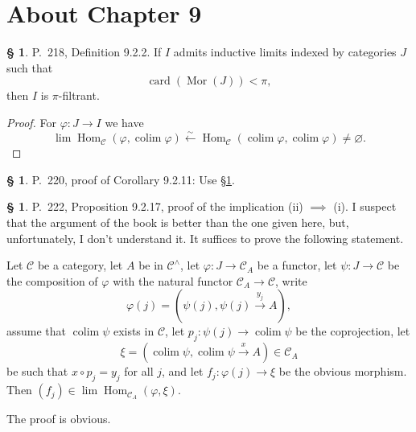 \documentclass[12pt]{article}
\theoremstyle{remark}
\theoremstyle{definition}
\newtheorem{s}[thm]{\S}
\newcommand{\C}{\mathcal C}
\newcommand{\xr}{\xrightarrow}
\DeclareMathOperator*{\co}{colim}
\DeclareMathOperator{\Hom}{Hom}%
\DeclareMathOperator{\Mor}{Mor}
\begin{document}
\section{About Chapter 9}
%
%
\begin{s}\label{922}
P.~218, Definition 9.2.2. If $I$ admits inductive limits indexed by categories $J$ such that 
$$
\operatorname{card}(\Mor(J))<\pi,
$$ 
then $I$ is $\pi$-filtrant.

\begin{proof}
For $\varphi:J\to I$ we have
$$
\lim\Hom_\C(\varphi,\co\varphi)\xleftarrow\sim\Hom_\C(\co\varphi,\co\varphi)\neq\varnothing.
$$
\end{proof}
\end{s}
%
%
\begin{s} 
P.~220, proof of Corollary 9.2.11: Use \S\ref{922}.
\end{s}
%
%
\begin{s} 
P.~222, Proposition 9.2.17, proof of the implication (ii) $\implies$ (i). I suspect that the argument of the book is better than the one given here, but, unfortunately, I don't understand it. It suffices to prove the following statement. 

Let $\C$ be a category, let $A$ be in $\C^\wedge$, let $\varphi:J\to\C_A$ be a functor, let $\psi:J\to\C$ be the composition of $\varphi$ with the natural functor $\C_A\to\C$, write 
$$
\varphi(j)=(\psi(j),\psi(j)\xr{y_j}A),
$$ 
assume that $\co\psi$ exists in $\C$, let $p_j:\psi(j)\to\co\psi$ be the coprojection, let 
$$
\xi=(\co\psi,\co\psi\xr x A)\in\C_A
$$ 
be such that $x\circ p_j=y_j$ for all $j$, and let $f_j:\varphi(j)\to\xi$ be the obvious morphism. Then $(f_j)\in\lim\Hom_{\C_A}(\varphi,\xi)$. 

The proof is obvious.
\end{s}
%
%
\end{document}
